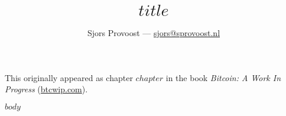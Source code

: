 \documentclass[$paper$paper,twocolumn,11pt]{article}
\title{$title$}
\author{Sjors Provoost — \href{mailto:sjors@sprovoost.nl}{sjors@sprovoost.nl}}
\begin{document}
\maketitle

This originally appeared as chapter $chapter$ in the book \emph{Bitcoin: A Work In Progress} (\href{https://btcwip.com/}{btcwip.com}).

\bigskip

$body$
\end{document}
